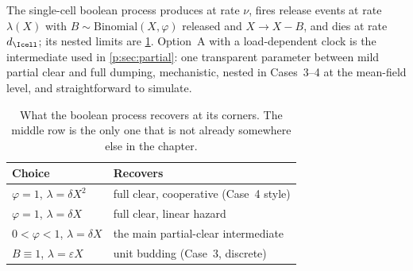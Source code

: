 The single-cell boolean process produces at rate $\nu$, fires release events
at rate $\lambda(X)$ with $B\sim\mathrm{Binomial}(X,\varphi)$ released and
$X\to X-B$, and dies at rate $d_{\Icell}$; its nested limits are
\cref{p:tab:boolean}. Option~A with a load-dependent clock is the
intermediate used in \cref{p:sec:partial}: one transparent parameter between
mild partial clear and full dumping, mechanistic, nested in Cases~3--4 at
the mean-field level, and straightforward to simulate.

\begin{table}[htbp]
\centering
\renewcommand{\arraystretch}{1.1}
\small
\begin{tabular}{@{}ll@{}}
\toprule
Choice & Recovers \\
\midrule
$\varphi=1$, $\lambda=\delta X^2$ & full clear, cooperative (Case~4 style) \\
$\varphi=1$, $\lambda=\delta X$ & full clear, linear hazard \\
$0<\varphi<1$, $\lambda=\delta X$ & the main partial-clear intermediate \\
$B\equiv1$, $\lambda=\varepsilon X$ & unit budding (Case~3, discrete) \\
\bottomrule
\end{tabular}
\caption{What the boolean process recovers at its corners. The middle row
is the only one that is not already somewhere else in the chapter.}
\label{p:tab:boolean}
\end{table}

\FloatBarrier
